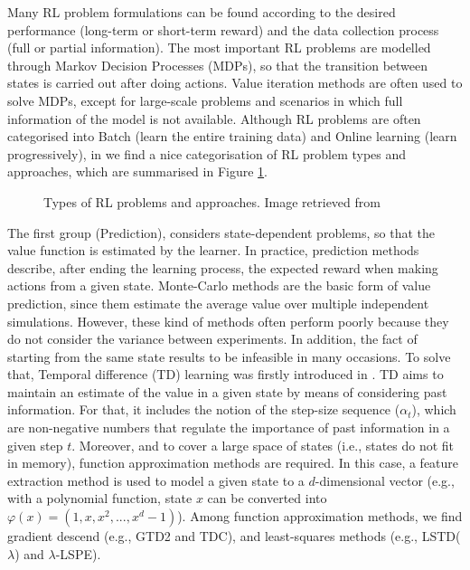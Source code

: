 \documentclass[12pt, a4paper,twoside]{tesi_upf}
\begin{document}
			Many RL problem formulations can be found according to the desired performance (long-term or short-term reward) and the data collection process (full or partial information). The most important RL problems are modelled through Markov Decision Processes (MDPs), so that the transition between states is carried out after doing actions. Value iteration methods are often used to solve MDPs, except for large-scale problems and scenarios in which full information of the model is not available. 
			Although RL problems are often categorised into Batch (learn the entire training data) and Online learning (learn progressively), in \cite{szepesvari2010algorithms} we find a nice categorisation of RL problem types and approaches, which are summarised in Figure \ref{fig:rl_types}.			
			\begin{figure}[h!]
				\centering
				\caption{Types of RL problems and approaches. Image retrieved from \cite{szepesvari2010algorithms}}
				\label{fig:rl_types}
			\end{figure}
					
			The first group (Prediction), considers state-dependent problems, so that the value function is estimated by the learner. In practice, prediction methods describe, after ending the learning process, the expected reward when making actions from a given state. Monte-Carlo methods \cite{robert2004monte} are the basic form of value prediction, since them estimate the average value over multiple independent simulations. However, these kind of methods often perform poorly because they do not consider the variance between experiments. In addition, the fact of starting from the same state results to be infeasible in many occasions. To solve that, Temporal difference (TD) learning was firstly introduced in \cite{sutton1988learning}. TD aims to maintain an estimate of the value in a given state by means of considering past information. For that, it includes the notion of the step-size sequence ($\alpha_t$), which are non-negative numbers that regulate the importance of past information in a given step $t$. Moreover, and to cover a large space of states (i.e., states do not fit in memory), function approximation methods are required. In this case, a feature extraction method is used to model a given state to a $d$-dimensional vector (e.g., with a polynomial function, state $x$ can be converted into $\varphi(x) = (1, x, x^2, ..., x^d-1)$).  Among function approximation methods, we find gradient descend (e.g., GTD2 and TDC), and least-squares methods (e.g., LSTD($\lambda$) and $\lambda$-LSPE).
			
\end{document}
